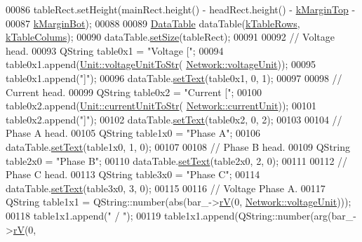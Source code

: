 \begin{DoxyCode}
00086   tableRect.setHeight(mainRect.height() - headRect.height() - \hyperlink{class_info_bar_a810c3286fc4d960d04ffbd31318ebff2}{kMarginTop} -
00087                       \hyperlink{class_info_bar_a18194bb46d36b00aa9f0d01f24a87617}{kMarginBot});
00088 
00089   \hyperlink{class_data_table}{DataTable} dataTable(\hyperlink{class_info_bar_ad54d2dd19a63caf9d2476aace60ae3c5}{kTableRows}, \hyperlink{class_info_bar_a57e9e7c40a6fd2a56dd47a4512d65489}{kTableColums});
00090   dataTable.\hyperlink{class_data_table_a8a8cd6f95caaaff148993f8e28eeb703}{setSize}(tableRect);
00091 
00092   \textcolor{comment}{// Voltage head.}
00093   QString table0x1 = \textcolor{stringliteral}{"Voltage ["};
00094   table0x1.append(\hyperlink{class_unit_a7fa103c31f9f069961b35b6371ff0c0a}{Unit::voltageUnitToStr}(
      \hyperlink{group___graphics_gacde031ef95f5c05565ee35769f2ed89e}{Network::voltageUnit}));
00095   table0x1.append(\textcolor{stringliteral}{"]"});
00096   dataTable.\hyperlink{class_data_table_aee0d28c77116b51360f0124a529cb3ff}{setText}(table0x1, 0, 1);
00097 
00098   \textcolor{comment}{// Current head.}
00099   QString table0x2 = \textcolor{stringliteral}{"Current ["};
00100   table0x2.append(\hyperlink{class_unit_a7bd3ed3edcb18170cd162d384075b651}{Unit::currentUnitToStr}(
      \hyperlink{group___graphics_gac6a26db5fef2b1dd2a00faf6340d1702}{Network::currentUnit}));
00101   table0x2.append(\textcolor{stringliteral}{"]"});
00102   dataTable.\hyperlink{class_data_table_aee0d28c77116b51360f0124a529cb3ff}{setText}(table0x2, 0, 2);
00103 
00104   \textcolor{comment}{// Phase A head.}
00105   QString table1x0 = \textcolor{stringliteral}{"Phase A"};
00106   dataTable.\hyperlink{class_data_table_aee0d28c77116b51360f0124a529cb3ff}{setText}(table1x0, 1, 0);
00107 
00108   \textcolor{comment}{// Phase B head.}
00109   QString table2x0 = \textcolor{stringliteral}{"Phase B"};
00110   dataTable.\hyperlink{class_data_table_aee0d28c77116b51360f0124a529cb3ff}{setText}(table2x0, 2, 0);
00111 
00112   \textcolor{comment}{// Phase C head.}
00113   QString table3x0 = \textcolor{stringliteral}{"Phase C"};
00114   dataTable.\hyperlink{class_data_table_aee0d28c77116b51360f0124a529cb3ff}{setText}(table3x0, 3, 0);
00115 
00116   \textcolor{comment}{// Voltage Phase A.}
00117   QString table1x1 = QString::number(abs(bar\_->\hyperlink{group___models_ga2d1f6bfbd8abaf168bb75bd8e5cd9b5e}{rV}(0, \hyperlink{group___graphics_gacde031ef95f5c05565ee35769f2ed89e}{Network::voltageUnit})));
00118   table1x1.append(\textcolor{stringliteral}{" / "});
00119   table1x1.append(QString::number(arg(bar\_->\hyperlink{group___models_ga2d1f6bfbd8abaf168bb75bd8e5cd9b5e}{rV}(0,

\end{DoxyCode}
